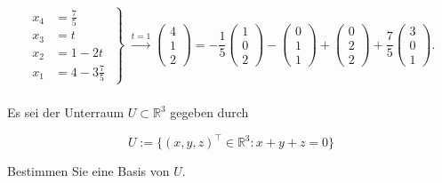 \begin{solution}
    \begin{equation*}
        \left.
        \begin{aligned} 
            x_4 &= \frac{7}{5} \\
            x_3 &= t \\
            x_2 &= 1 - 2t \\
            x_1 &= 4 - 3\frac{7}{5} 
        \end{aligned} \;
        \right\} \; \xrightarrow{t=1} \begin{pmatrix}
            4 \\ 1 \\ 2
        \end{pmatrix} = - \frac{1}{5} \begin{pmatrix}
            1 \\ 0 \\ 2
        \end{pmatrix} - \begin{pmatrix}
            0 \\ 1 \\ 1
        \end{pmatrix} + \begin{pmatrix}
            0 \\ 2 \\ 2
        \end{pmatrix} + \frac{7}{5} \begin{pmatrix}
            3 \\ 0 \\ 1
        \end{pmatrix}.
    \end{equation*}

\end{solution}

\newpage

\subsubsection{} %

Es sei der Unterraum \( U \subset \mathbb{R}^3 \) gegeben durch 

\begin{equation*}
    U := \{(x,y,z)^\top \in \mathbb{R}^3:x+y+z=0\}
\end{equation*}

Bestimmen Sie eine Basis von \( U \). 

\vspace{1\baselineskip}

